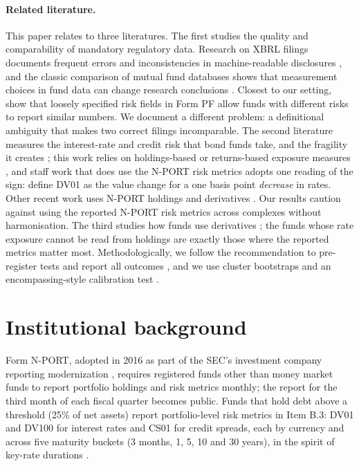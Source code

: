 \documentclass[11pt]{article}
\begin{document}
\paragraph{Related literature.} This paper relates to three literatures. The first studies the
quality and comparability of mandatory regulatory data. Research on XBRL filings documents frequent
errors and inconsistencies in machine-readable disclosures \citep{debreceny2010,du2013}, and the
classic comparison of mutual fund databases shows that measurement choices in fund data can change
research conclusions \citep{elton2001}. Closest to our setting, \citet{flood2015} show that loosely specified risk fields in Form PF allow funds with different risks to report similar numbers. We document a different problem: a definitional ambiguity
that makes two correct filings incomparable. The second literature measures the interest-rate and
credit risk that bond funds take, and the fragility it creates \citep{becker2015,choi2018,goldstein2017,falato2021,ma2022};
this work relies on holdings-based or returns-based exposure measures \citep{barth2024}, and staff work that does use the N-PORT risk metrics adopts one reading of the sign: \citet{iorio2024} define DV01 as the value change for a one basis point \emph{decrease} in rates. Other recent work uses N-PORT holdings and derivatives \citep{kaniel2025}. Our results caution
against using the reported N-PORT risk metrics across complexes without harmonisation. The third
studies how funds use derivatives \citep{koski1999}; the funds whose rate exposure cannot be read
from holdings are exactly those where the reported metrics matter most. Methodologically, we follow
the recommendation to pre-register tests and report all outcomes \citep{harvey2017}, and we use
cluster bootstraps \citep{cameron2008} and an encompassing-style calibration test
\citep{chong1986,harvey1998}.

\section{Institutional background}\label{sec:background}

Form N-PORT, adopted in 2016 as part of the SEC's investment company reporting modernization
\citep{sec_2016}, requires registered funds other than money market funds to report portfolio
holdings and risk metrics monthly; the report for the third month of each fiscal quarter becomes
public. Funds that hold debt above a threshold (25\% of net assets) report portfolio-level risk
metrics in Item B.3: DV01 and DV100 for interest rates and CS01 for credit spreads, each by currency
and across five maturity buckets (3 months, 1, 5, 10 and 30 years), in the spirit of key-rate durations \citep{ho1992,tuckman2022}.
\end{document}
